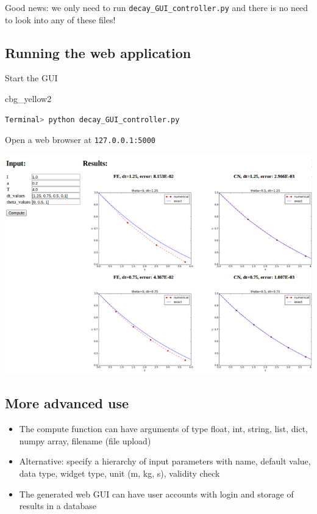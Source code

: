 \documentclass[%
oneside,                 %
final,                   %
10pt]{article}
\newenvironment{_cod_tight}[1]{
   \def\FrameCommand{\colorbox{#1}}
   \FrameRule0.6pt\MakeFramed {\FrameRestore}\vskip3mm}
   {\vskip0mm\endMakeFramed}
\newenvironment{cod}[1]{
\bgroup\rmfamily
\fboxsep=0mm\relax
\begin{_cod_tight}{#1}
\list{}{\parsep=-2mm\parskip=0mm\topsep=0pt\leftmargin=2mm
\rightmargin=2\leftmargin\leftmargin=4pt\relax}
\item\relax}
{\endlist\end{_cod_tight}\egroup}
\begin{document}
\noindent
Good news: we only need to run \Verb!decay_GUI_controller.py!
and there is no need to look into any of these files!

\subsection*{Running the web application}

Start the GUI

\begin{cod}{cbg_yellow2}\begin{lstlisting}[language=bash,style=simple,xleftmargin=2mm]
Terminal> python decay_GUI_controller.py
\end{lstlisting}\end{cod}
\noindent
Open a web browser at \texttt{127.0.0.1:5000}



\centerline{\includegraphics[width=1.0\linewidth]{fig-softeng/web_GUI.png}}



\subsection*{More advanced use}

\begin{itemize}
 \item The compute function can have arguments of type float, int, string,
   list, dict, numpy array, filename (file upload)

 \item Alternative: specify a hierarchy of input parameters with name,
   default value, data type, widget type, unit (m, kg, s), validity check

 \item The generated web GUI can have user accounts with login and storage
   of results in a database
\end{itemize}
\end{document}
